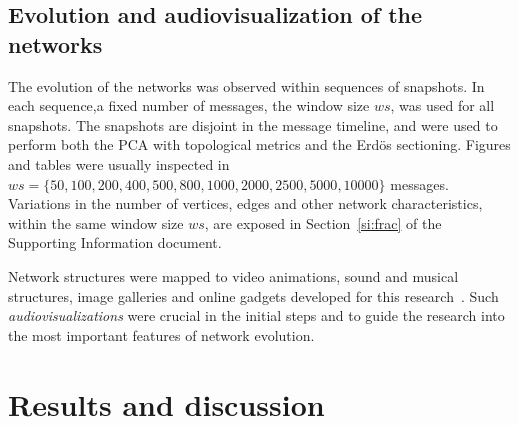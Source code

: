 \documentclass[%
	aip,
	jmp,%
	amsmath,amssymb,
	reprint,%
]{revtex4-1}
\begin{document}
\subsection{Evolution and audiovisualization of the networks}\label{sec:viz}
The evolution of the networks was observed within 
sequences of snapshots.
In each sequence,a fixed number of messages,
the window size $ws$, was used for all snapshots.
The snapshots are disjoint in the message timeline,
and were used to perform both the PCA
with topological metrics and the Erd\"os sectioning.  
Figures and tables were usually inspected in
$ws=\{50, 100, 200, 400, 500, 800, 1000, 2000, 2500, 5000, 10000\}$ messages.
Variations in the number of vertices, edges
and other network characteristics, within the same window size $ws$,
are exposed in Section~\ref{si:frac}
of the Supporting Information document. 

Network structures were mapped to video animations, sound and musical structures,
image galleries and online gadgets developed for this research~\cite{animacoes,galGMANE,appGMANE}.
Such \emph{audiovisualizations} were crucial in the initial steps and
to guide the research into the most important features of network evolution.

\section{Results and discussion}\label{sec:results}
\end{document}
